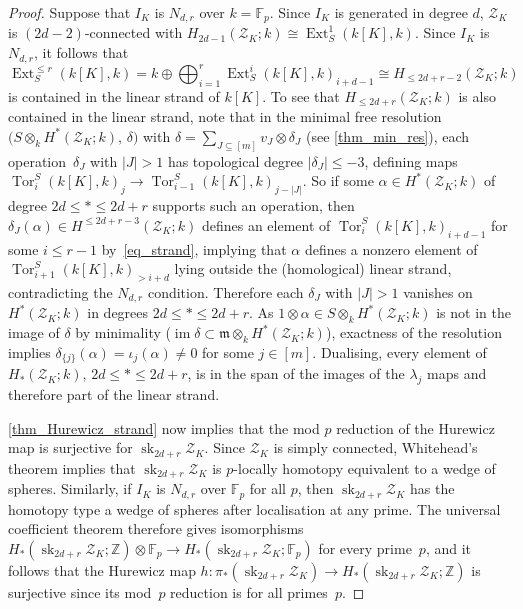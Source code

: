 \documentclass[a4paper,10pt]{amsart}
\theoremstyle{definition}
\theoremstyle{remark}
\DeclareMathOperator{\Ext}{Ext}
\DeclareMathOperator{\Tor}{Tor}
\begin{document}
\begin{proof}
Suppose that $I_K$ is $N_{d,r}$ over $k=\mathbb{F}_p$. Since $I_K$ is generated in degree $d$, $\mathcal{Z}_K$ is $(2d-2)$-connected with $H_{2d-1}(\mathcal{Z}_K;k)\cong\Ext_S^1(k[K],k)$. Since $I_K$ is $N_{d,r}$, it follows that 
\begin{equation} \label{eq_strand}
\Ext_S^{\leqslant r}(k[K],k)=k \oplus\bigoplus_{i=1}^r\Ext_S^i(k[K],k)_{i+d-1} \cong H_{\leqslant 2d+r-2}(\mathcal{Z}_K;k)
\end{equation}
is contained in the linear strand of $k[K]$. To see that $H_{\leqslant 2d+r}(\mathcal{Z}_K;k)$ is also contained in the linear strand, note that in the minimal free resolution $\big( S\otimes_k H^*(\mathcal{Z}_K;k),\, \delta \big)$ with $\delta=\sum_{J\subseteq[m]}v_J\otimes\delta_J$ (see \cref{thm_min_res}), each operation~$\delta_J$ with $|J|>1$ has topological degree $|\delta_J|\leqslant -3$, defining maps $\Tor^S_i(k[K],k)_j \to \Tor^S_{i-1}(k[K],k)_{j-|J|}$. So if some $\alpha \in H^*(\mathcal{Z}_K;k)$ of degree $2d\leqslant *\leqslant 2d+r$ supports such an operation, then $\delta_J(\alpha)\in H^{\leqslant 2d+r-3}(\mathcal{Z}_K;k)$ defines an element of $\Tor^S_i(k[K],k)_{i+d-1}$ for some $i\leqslant r-1$ by~\eqref{eq_strand}, implying that $\alpha$ defines a nonzero element of $\Tor^S_{i+1}(k[K],k)_{>i+d}$ lying outside the (homological) linear strand, contradicting the $N_{d,r}$ condition. Therefore each $\delta_J$ with $|J|>1$ vanishes on $H^*(\mathcal{Z}_K;k)$ in degrees $2d\leqslant *\leqslant 2d+r$. As $1\otimes\alpha \in S\otimes_k H^*(\mathcal{Z}_K;k)$ is not in the image of $\delta$ by minimality ($\operatorname{im}\delta\subset \mathfrak{m}\otimes_k H^*(\mathcal{Z}_K;k)$), exactness of the resolution implies $\delta_{\{j\}}(\alpha)=\iota_j(\alpha) \neq 0$ for some $j\in[m]$. Dualising, every element of $H_*(\mathcal{Z}_K;k)$, $2d\leqslant *\leqslant 2d+r$, is in the span of the images of the $\lambda_j$ maps and therefore part of the linear strand.

\cref{thm_Hurewicz_strand} now implies that the mod $p$ reduction of the Hurewicz map is surjective for $\operatorname{sk}_{2d+r}\mathcal{Z}_K$. Since $\mathcal{Z}_K$ is simply connected, Whitehead's theorem implies that $\operatorname{sk}_{2d+r}\mathcal{Z}_K$ is $p$-locally homotopy equivalent to a wedge of spheres. Similarly, if $I_K$ is $N_{d,r}$ over $\mathbb{F}_p$ for all $p$, then $\operatorname{sk}_{2d+r}\mathcal{Z}_K$ has the homotopy type a wedge of spheres after localisation at any prime. The universal coefficient theorem therefore gives isomorphisms
$H_*(\operatorname{sk}_{2d+r}\mathcal{Z}_K;\mathbb{Z}) \otimes \mathbb{F}_p \to H_*(\operatorname{sk}_{2d+r}\mathcal{Z}_K;\mathbb{F}_p)$ for every prime~$p$, and it follows that the Hurewicz map $h\colon \pi_*(\operatorname{sk}_{2d+r}\mathcal{Z}_K) \to H_*(\operatorname{sk}_{2d+r}\mathcal{Z}_K;\mathbb{Z})$ is surjective since its mod~$p$ reduction is for all primes~$p$.
\end{proof}
\end{document}
